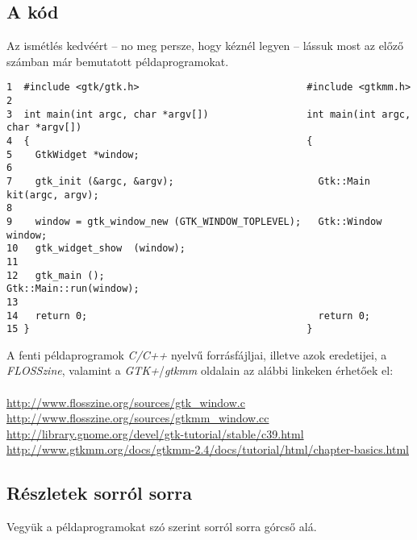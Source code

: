 \documentclass[a4paper,10pt]{article}
\begin{document}
\subsection{A kód}
\label{sec:gtkminimal}
\label{sec:gtkmmminimal}

Az ismétlés kedvéért -- no meg persze, hogy kéznél legyen -- lássuk most az előző számban már bemutatott példaprogramokat.

\vspace{16pt}
\fontsize{8pt}{8pt}
\begin{verbatim}
1  #include <gtk/gtk.h>                             #include <gtkmm.h>
2
3  int main(int argc, char *argv[])                 int main(int argc, char *argv[])
4  {                                                {
5    GtkWidget *window;
6
7    gtk_init (&argc, &argv);                         Gtk::Main kit(argc, argv);
8
9    window = gtk_window_new (GTK_WINDOW_TOPLEVEL);   Gtk::Window window;
10   gtk_widget_show  (window);
11
12   gtk_main ();                                     Gtk::Main::run(window);
13
14   return 0;                                        return 0;
15 }                                                }
\end{verbatim} 

A fenti példaprogramok \textit{C/C++} nyelvű forrásfájljai, illetve azok eredetijei, a \textit{FLOSSzine}, valamint a \textit{GTK+}/\textit{gtkmm} oldalain az alábbi linkeken érhetőek el:
\ \\\\
\url{http://www.flosszine.org/sources/gtk_window.c}\\
\url{http://www.flosszine.org/sources/gtkmm_window.cc}\\
\url{http://library.gnome.org/devel/gtk-tutorial/stable/c39.html}\\
\url{http://www.gtkmm.org/docs/gtkmm-2.4/docs/tutorial/html/chapter-basics.html}

\subsection{Részletek sorról sorra}

Vegyük a példaprogramokat szó szerint sorról sorra górcső alá.
\end{document}

